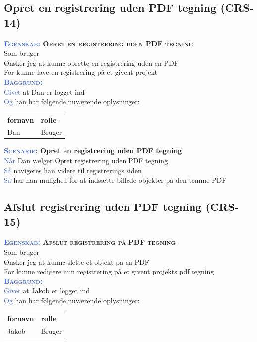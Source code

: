 \subsection{Opret en registrering uden PDF tegning (CRS-14)} \label{sec:USOpretRegUdenPDF}
\textbf{\textsc{\textcolor{RoyalBlue}{Egenskab:} Opret en registrering uden PDF tegning}}\\
Som bruger\\
Ønsker jeg at kunne oprette en registrering uden en PDF\\
For kunne lave en registrering på et givent projekt\\

\textsc{\textcolor{RoyalBlue}{\textbf{Baggrund:}}}\\
\textcolor{RoyalBlue}{Givet} at Dan er logget ind\\
\textcolor{RoyalBlue}{Og} han har følgende nuværende oplysninger:\\
\begin{tabular}{| l | l |}
	\textbf{fornavn} & \textbf{rolle} \\
	Dan & Bruger\\
\end{tabular}
\newline

\textbf{\textsc{\textcolor{RoyalBlue}{Scenarie:}} Opret en registrering uden PDF tegning}\\
\textcolor{RoyalBlue}{Når} Dan vælger Opret registrering uden PDF tegning\\
\textcolor{RoyalBlue}{Så} navigeres han videre til registrerings siden\\
\textcolor{RoyalBlue}{Så} har han mulighed for at indsætte billede objekter på den tomme PDF\\

\clearpage

\subsection{Afslut registrering uden PDF tegning (CRS-15)} \label{sec:USAfslutRegUdenPDF}
\textbf{\textsc{\textcolor{RoyalBlue}{Egenskab:} Afslut registrering på PDF tegning}}\\
Som bruger\\
Ønsker jeg at kunne slette et objekt på en PDF\\
For kunne redigere min registrering på et givent projekts pdf tegning\\

\textsc{\textcolor{RoyalBlue}{\textbf{Baggrund:}}}\\
\textcolor{RoyalBlue}{Givet} at Jakob er logget ind\\
\textcolor{RoyalBlue}{Og} han har følgende nuværende oplysninger:\\
\begin{tabular}{| l | l |}
	\textbf{fornavn} & \textbf{rolle} \\
	Jakob & Bruger\\
\end{tabular}

